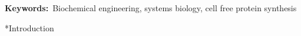 \documentclass[12pt]{article}
\makeatletter
\renewcommand\section{\@startsection
	{subsection}{2}{0mm}
	{-0.2in}
	{0.05\baselineskip}
	{\normalfont\large\bfseries}}
\makeatother
\begin{document}
\vspace{0.1in}
{\noindent \textbf{Keywords:}~Biochemical engineering, systems biology, cell free protein synthesis}



\pagebreak

\setcounter{page}{1}



\section*{Introduction}
\end{document}
